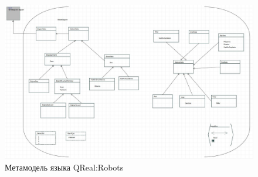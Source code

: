 \documentclass[a4paper]{article}
\begin{document}
\begin{figure} [ht]
  \begin{center}
    \includegraphics[width=\textwidth]{robotsMetamodel.jpg}
    \caption{Метамодель языка QReal:Robots}
    \label{robotsMetamodel}
  \end{center}
\end{figure}
\end{document}
